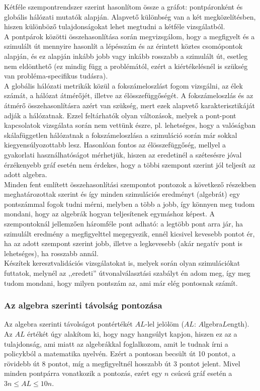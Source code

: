     Kétféle szempontrendszer szerint hasonlítom össze a gráfot: pontpáronként és globális hálózati mutatók alapján. Alapvető különbség van a két megközelítésben, hiszen különböző tulajdonságokat lehet megtudni a kétféle vizsgálatból.\\

    A pontpárok közötti összehasonlítása során megvizsgálom, hogy a megfigyelt és a szimulált út mennyire hasonlít a lépésszám és az érintett köztes csomópontok alapján, és ez alapján inkább jobb vagy inkább rosszabb a szimulált út, esetleg nem eldönthető (ez mindig függ a problémától, ezért a kiértékelésnél is szükség van probléma-specifikus tudásra).\\

    A globális hálózati metrikák közül a fokszámeloszlást fogom vizsgálni, az élek számát, a hálózat átmérőjét, illetve az élösszefüggőségét. A fokszámeloszlás és az átmérő összehasonlításra azért van szükség, mert ezek alapvető karakterisztikáját adják a hálózatnak. Ezzel feltárhatók olyan változások, melyek a pont-pont kapcsolatok vizsgálata során nem vettünk észre, pl. lehetséges, hogy a valóságban skálafüggetlen hálózatnak a fokszámeloszlása a szimuláció során már sokkal kiegyensúlyozottabb lesz. Hasonlóan fontos az élösszefüggőség, mellyel a gyakorlati használhatóságot mérhetjük, hiszen az eredetinél a szétesésre jóval érzékenyebb gráf esetén nem érdekes, hogy a többi szempont szerint jól teljesít az adott algebra.\\

    Minden fent említett összehasonlítási szempontot pontozok a következő részekben meghatározottak szerint és így minden szimulációs eredményt (algebrát) egy pontszámmal fogok tudni mérni, melyben a több a jobb, így könnyen meg tudom mondani, hogy az algebrák hogyan teljesítenek egymáshoz képest. A szempontoknál jellemzően háromféle pont adható: a legtöbb pont arra jár, ha szimulált eredmény a megfigyelttel megegyezik, ennél kicsivel kevesebb pontot ér, ha az adott szempont szerint jobb, illetve a legkevesebb (akár negatív pont is lehetséges), ha rosszabb annál.\\
    Készítek keresztvalidációs vizsgálatokat is, melyek során olyan szimulációkat futtatok, melynél az ,,eredeti'' útvonalválasztási szabályt én adom meg, így meg tudom mondani, hogy milyen pontszám az, ami már elég pontosnak számít.

    \subsubsection{Az algebra szerinti távolság pontozása}
    Az algebra szerinti távolságot pontértékét $AL$-lel jelölöm ($AL$: $A$lgebra$L$ength). Az $AL$ értékét úgy alakítom ki, hogy nagy hangsúlyt kapjon, hiszen ez az a tulajdonság, ami miatt az algebrákkal foglalkozom, amit le tudnak írni a policykból a matematika nyelvén. Ezért a pontosan becsült út 10 pontot, a rövidebb út 8 pontot, míg a megfigyeltnél hosszabb út 3 pontot jelent. Mivel minden pontpárra vonatkozik a pontozás, ezért egy $n$ csúcsú gráf esetén a $3n \leq AL \leq 10n$.

